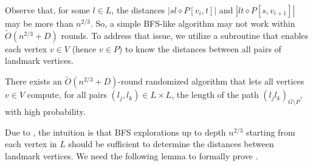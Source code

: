 Observe that, for some $l \in L$, the distances $|sl \diamond P[v_{i},t]|$ and $|lt \diamond P[s,v_{i+1}]|$ may be more than $n^{2/3}$. So, a simple BFS-like algorithm may not work within $\widetilde{O}(n^{2/3}+D)$ rounds. To address that issue, we utilize a subroutine %
that enables each vertex $v \in V$ (hence $v \in P$) to know the distances between all pairs of landmark vertices.








\begin{lemma}
\label{lem : land to land}
    There exists an $\widetilde{O}(n^{2/3}+D)$-round randomized algorithm that lets all vertices  $v \in V$ compute, for all pairs $(l_j,l_k) \in L \times L$, the length of the path $(l_jl_k)_{G \setminus P}$, with high probability.
\end{lemma}
Due to , the intuition is that BFS explorations up to depth $n^{2/3}$ starting from each vertex in $L$ should be sufficient to determine the distances between landmark vertices. We need the following lemma to formally prove .

